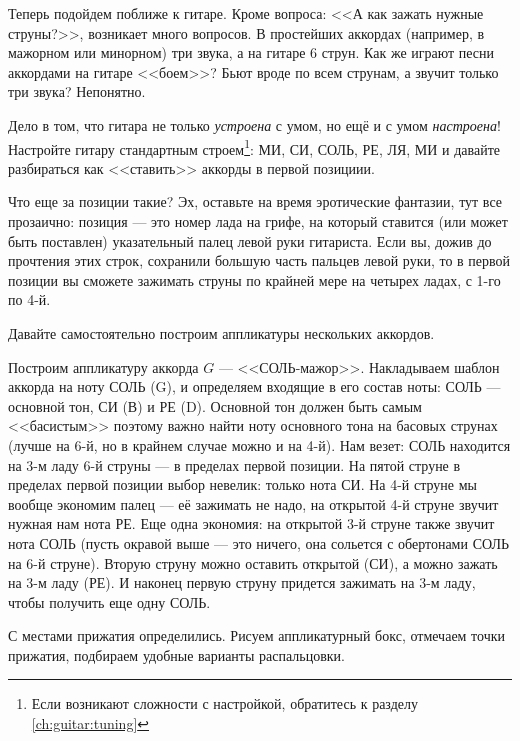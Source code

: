 Теперь подойдем поближе к гитаре. Кроме вопроса: <<А как зажать нужные струны?>>, возникает много вопросов. В простейших аккордах (например, в мажорном или минорном) три звука, а на гитаре 6 струн. Как же играют песни аккордами на гитаре <<боем>>? Бьют вроде по всем струнам, а звучит только три звука? Непонятно.

Дело в том, что гитара не только \emph{устроена} с умом, но ещё и с умом \emph{настроена}! Настройте гитару стандартным строем\footnote{Если возникают сложности с настройкой, обратитесь к разделу \ref{ch:guitar:tuning}}: МИ, СИ, СОЛЬ, РЕ, ЛЯ, МИ и давайте разбираться как <<ставить>> аккорды в первой позициии.

Что еще за позиции такие? Эх, оставьте на время эротические фантазии, тут все прозаично: позиция --- это номер лада на грифе, на который ставится (или может быть поставлен) указательный палец левой руки гитариста. Если вы, дожив до прочтения этих строк, сохранили большую часть пальцев левой руки, то в первой позиции вы сможете зажимать струны по крайней мере на четырех ладах, с 1-го по 4-й. 

Давайте самостоятельно построим аппликатуры нескольких аккордов. 

Построим аппликатуру аккорда $G$ --- <<СОЛЬ-мажор>>. Накладываем шаблон аккорда на ноту СОЛЬ (G), и определяем входящие в его состав ноты: СОЛЬ --- основной тон, СИ (В) и РЕ (D). Основной тон должен быть самым <<басистым>> поэтому важно найти ноту основного тона на басовых струнах (лучше на 6-й, но в крайнем случае можно и на 4-й). Нам везет: СОЛЬ находится на 3-м ладу 6-й струны --- в пределах первой позиции. На пятой струне в пределах первой позиции выбор невелик: только нота СИ. На 4-й струне мы вообще экономим палец --- её зажимать не надо, на открытой 4-й струне звучит нужная нам нота РЕ. Еще одна экономия: на открытой 3-й струне также звучит нота СОЛЬ (пусть окравой выше --- это ничего, она сольется с обертонами СОЛЬ на 6-й струне). Вторую струну можно оставить открытой (СИ), а можно зажать на 3-м ладу (РЕ). И наконец первую струну придется зажимать на 3-м ладу, чтобы получить еще одну СОЛЬ.

С местами прижатия определились. Рисуем аппликатурный бокс, отмечаем точки прижатия, подбираем удобные варианты распальцовки.






